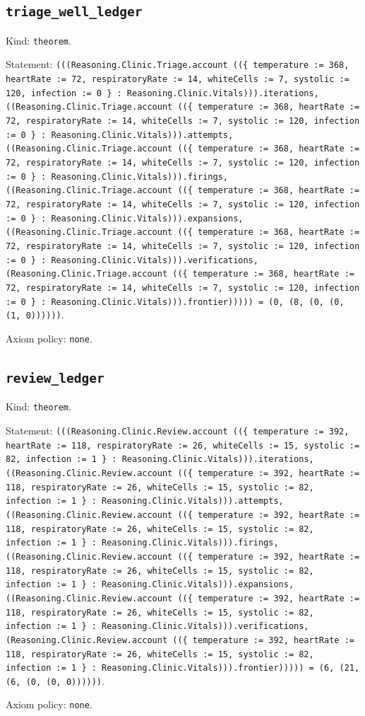 \documentclass[11pt]{article}
\begin{document}
\subsection*{\texttt{triage\_well\_ledger}}
\noindent Kind: \texttt{theorem}.\par
\noindent Statement: \texttt{(((Reasoning.Clinic.Triage.account ((\{ temperature := 368, heartRate := 72, respiratoryRate := 14, whiteCells := 7, systolic := 120, infection := 0 \} : Reasoning.Clinic.Vitals))).iterations, ((Reasoning.Clinic.Triage.account ((\{ temperature := 368, heartRate := 72, respiratoryRate := 14, whiteCells := 7, systolic := 120, infection := 0 \} : Reasoning.Clinic.Vitals))).attempts, ((Reasoning.Clinic.Triage.account ((\{ temperature := 368, heartRate := 72, respiratoryRate := 14, whiteCells := 7, systolic := 120, infection := 0 \} : Reasoning.Clinic.Vitals))).firings, ((Reasoning.Clinic.Triage.account ((\{ temperature := 368, heartRate := 72, respiratoryRate := 14, whiteCells := 7, systolic := 120, infection := 0 \} : Reasoning.Clinic.Vitals))).expansions, ((Reasoning.Clinic.Triage.account ((\{ temperature := 368, heartRate := 72, respiratoryRate := 14, whiteCells := 7, systolic := 120, infection := 0 \} : Reasoning.Clinic.Vitals))).verifications, (Reasoning.Clinic.Triage.account ((\{ temperature := 368, heartRate := 72, respiratoryRate := 14, whiteCells := 7, systolic := 120, infection := 0 \} : Reasoning.Clinic.Vitals))).frontier))))) = (0, (8, (0, (0, (1, 0))))))}.\par
\noindent Axiom policy: \texttt{none}.\par
\subsection*{\texttt{review\_ledger}}
\noindent Kind: \texttt{theorem}.\par
\noindent Statement: \texttt{(((Reasoning.Clinic.Review.account ((\{ temperature := 392, heartRate := 118, respiratoryRate := 26, whiteCells := 15, systolic := 82, infection := 1 \} : Reasoning.Clinic.Vitals))).iterations, ((Reasoning.Clinic.Review.account ((\{ temperature := 392, heartRate := 118, respiratoryRate := 26, whiteCells := 15, systolic := 82, infection := 1 \} : Reasoning.Clinic.Vitals))).attempts, ((Reasoning.Clinic.Review.account ((\{ temperature := 392, heartRate := 118, respiratoryRate := 26, whiteCells := 15, systolic := 82, infection := 1 \} : Reasoning.Clinic.Vitals))).firings, ((Reasoning.Clinic.Review.account ((\{ temperature := 392, heartRate := 118, respiratoryRate := 26, whiteCells := 15, systolic := 82, infection := 1 \} : Reasoning.Clinic.Vitals))).expansions, ((Reasoning.Clinic.Review.account ((\{ temperature := 392, heartRate := 118, respiratoryRate := 26, whiteCells := 15, systolic := 82, infection := 1 \} : Reasoning.Clinic.Vitals))).verifications, (Reasoning.Clinic.Review.account ((\{ temperature := 392, heartRate := 118, respiratoryRate := 26, whiteCells := 15, systolic := 82, infection := 1 \} : Reasoning.Clinic.Vitals))).frontier))))) = (6, (21, (6, (0, (0, 0))))))}.\par
\noindent Axiom policy: \texttt{none}.\par
\end{document}
